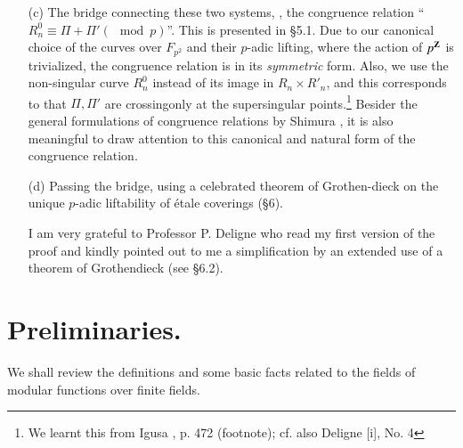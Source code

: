 \begin{itemize}
\item[(c)] The bridge connecting these two systems, \ie, the congruence relation ``$R^0_n \equiv \Pi + \Pi' (\mod p)$''. This is presented in \S 5.1. Due to our canonical choice of the curves over $F_{p^2}$ and their $p$-adic lifting, where the action of $p^{\mathbf{Z}}$ is trivialized, the congruence relation is in its \textit{symmetric} form. Also, we use the non-singular curve $R^0_n$ instead of its image in $R_n \times R'_n$, and this corresponds to that $\Pi, \Pi'$ are crossing\pageoriginale only at the supersingular points.\footnote{We learnt this from Igusa \cite{art6-key5}, p. 472 (footnote); cf. also Deligne [i], No. 4} Besider the general formulations of congruence relations by Shimura \cite{art6-key18}, it is also meaningful to draw attention to this canonical and natural form of the congruence relation.

\item[(d)] Passing the bridge, using a celebrated theorem of Grothen-dieck on the unique $p$-adic liftability of \'etale coverings (\S 6).

I am very grateful to Professor P. Deligne who read my first version of the proof and kindly pointed out to me a simplification by an extended use of a theorem of Grothendieck (see \S 6.2).
\end{itemize}

\section{Preliminaries.}\label{art6-sec1}
 We shall review the definitions and some basic facts related to the fields of modular functions over finite fields.

